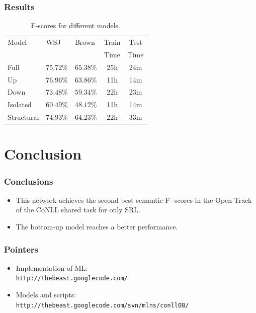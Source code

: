 \documentclass{beamer}
\begin{document}
\begin{frame}
    \frametitle{Results}

\begin{table}
\begin{center}
\small
\begin{tabular}{|l|l|l|c|c|}\hline
Model                & WSJ                & Brown              & Train & Test\\
                     &                    &                    & Time & Time\\\hline\hline
Full         & $75.72\%$          & $\mathbf{65.38}\%$ & 25h & 24m\\\hline
Up           & $\mathbf{76.96\%}$ & $63.86\%$          & 11h & 14m\\\hline
Down         & $73.48\%$          & $59.34\%$          & 22h & 23m\\\hline
Isolated     & $60.49\%$          & $48.12\%$          & 11h & 14m\\\hline
Structural   & $74.93\%$          & $64.23\%$          & 22h & 33m\\\hline   
\end{tabular}
\caption{F-scores for different models.}
\label{tbl:results}
\normalsize
\end{center}
\end{table}
\end{frame}

\section{Conclusion}
\begin{frame}
    \frametitle{Conclusions}

    \begin{itemize}
    \item This network achieves the second best semantic F-
scores in the Open Track of the CoNLL shared task for only SRL.
    \bigskip
    \item The bottom-up model reaches a better performance.
    \end{itemize}
\end{frame}

\begin{frame}
    \frametitle{Pointers}

    \begin{itemize}
    \item Implementation of ML:\\ \texttt{http://thebeast.googlecode.com/}
    \bigskip 
    \item Models and scripts:\\ \texttt{http://thebeast.googlecode.com/svn/mlns/conll08/}
    \end{itemize}
\end{frame}
\end{document}
